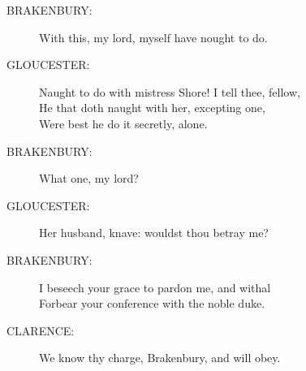 \documentclass{article}
\begin{document}
\begin{description}
\item[BRAKENBURY:] 
\hspace{1pt}With this, my lord, myself have nought to do.\\
\end{description}
\begin{description}
\item[GLOUCESTER:] 
\hspace{1pt}Naught to do with mistress Shore! I tell thee, fellow,\\
\hspace{1pt}He that doth naught with her, excepting one,\\
\hspace{1pt}Were best he do it secretly, alone.\\
\end{description}
\begin{description}
\item[BRAKENBURY:] 
\hspace{1pt}What one, my lord?\\
\end{description}
\begin{description}
\item[GLOUCESTER:] 
\hspace{1pt}Her husband, knave: wouldst thou betray me?\\
\end{description}
\begin{description}
\item[BRAKENBURY:] 
\hspace{1pt}I beseech your grace to pardon me, and withal\\
\hspace{1pt}Forbear your conference with the noble duke.\\
\end{description}
\begin{description}
\item[CLARENCE:] 
\hspace{1pt}We know thy charge, Brakenbury, and will obey.\\
\end{description}
\end{document}
